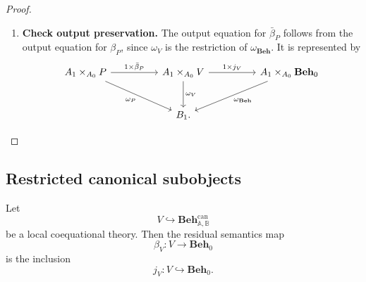 \begin{proof}
\begin{enumerate}
        \item \textbf{Check output preservation.}
        The output equation for \(\bar\beta_P\) follows from the output equation
        for \(\beta_P\), since \(\omega_V\) is the restriction of
        \(\omega_{\mathbf{Beh}}\). It is represented by
        \[
        \begin{tikzcd}[column sep=huge, row sep=large]
            A_1\times_{A_0}P
                \arrow[r, "{1\times \bar\beta_P}"]
                \arrow[dr, "\omega_P"']
            &
            A_1\times_{A_0}V
                \arrow[d, "\omega_V"]
                \arrow[r, "{1\times j_V}"]
            &
            A_1\times_{A_0}\mathbf{Beh}_0
                \arrow[dl, "\omega_{\mathbf{Beh}}"]
            \\
            &
            B_1 .
        \end{tikzcd}
        \]
    \end{enumerate}
\end{proof}

\subsection{Restricted canonical subobjects}
\label{subsec:restricted-canonical-subobjects}

\begin{lemma}
\label{lem:semantic-map-of-a-restricted-canonical-subobject}
    Let
    \[
        V\hookrightarrow\mathbf{Beh}^{\mathrm{can}}_{\mathbb A,\mathbb B}
    \]
    be a local coequational theory. Then the residual semantics map
    \[
        \beta_V:V\to\mathbf{Beh}_0
    \]
    is the inclusion
    \[
        j_V:V\hookrightarrow\mathbf{Beh}_0.
    \]
\end{lemma}

